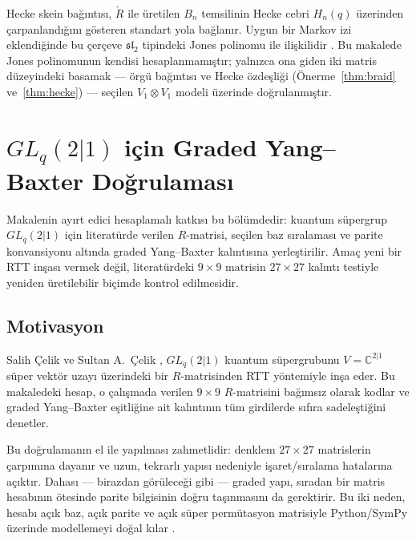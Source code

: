 \documentclass[10pt]{math}
\numberwithin{equation}{section}
\theoremstyle{plain}
\theoremstyle{definition}
\renewcommand{\sl}{\mathfrak{sl}}
\begin{document}
Hecke skein bağıntısı, $\check R$ ile üretilen $B_n$ temsilinin Hecke cebri
$H_n(q)$ üzerinden çarpanlandığını gösteren standart yola bağlanır. Uygun bir
Markov izi eklendiğinde bu çerçeve $\sl_2$ tipindeki Jones polinomu ile
ilişkilidir \cite{Jones}. Bu makalede Jones polinomunun kendisi
hesaplanmamıştır; yalnızca ona giden iki matris düzeyindeki basamak --- örgü
bağıntısı ve Hecke özdeşliği (Önerme~\ref{thm:braid} ve~\ref{thm:hecke}) ---
seçilen $V_1\otimes V_1$ modeli üzerinde doğrulanmıştır.

\section{$GL_q(2|1)$ için Graded Yang--Baxter Doğrulaması}

Makalenin ayırt edici hesaplamalı katkısı bu bölümdedir: kuantum süpergrup
$GL_q(2|1)$ için literatürde verilen $R$-matrisi, seçilen baz sıralaması ve
parite konvansiyonu altında graded Yang--Baxter kalıntısına yerleştirilir.
Amaç yeni bir RTT inşası vermek değil, literatürdeki $9\times 9$ matrisin
$27\times 27$ kalıntı testiyle yeniden üretilebilir biçimde kontrol edilmesidir.

\subsection{Motivasyon}

Salih Çelik ve Sultan A.\ Çelik \cite{CelikGL21}, $GL_q(2|1)$ kuantum süpergrubunu
$V=\mathbb{C}^{2|1}$ süper vektör uzayı üzerindeki bir $R$-matrisinden RTT
yöntemiyle inşa eder. Bu makaledeki hesap, o çalışmada verilen $9\times 9$
$R$-matrisini bağımsız olarak kodlar ve graded Yang--Baxter eşitliğine ait
kalıntının tüm girdilerde sıfıra sadeleştiğini denetler.

Bu doğrulamanın el ile yapılması zahmetlidir: denklem $27\times 27$ matrislerin
çarpımına dayanır ve uzun, tekrarlı yapısı nedeniyle işaret/sıralama hatalarına
açıktır. Dahası --- birazdan görüleceği gibi --- graded yapı, sıradan bir
matris hesabının ötesinde parite bilgisinin doğru taşınmasını da gerektirir. Bu
iki neden, hesabı açık baz, açık parite ve açık süper permütasyon matrisiyle
Python/SymPy üzerinde modellemeyi doğal kılar \cite{SymPy}.
\end{document}
